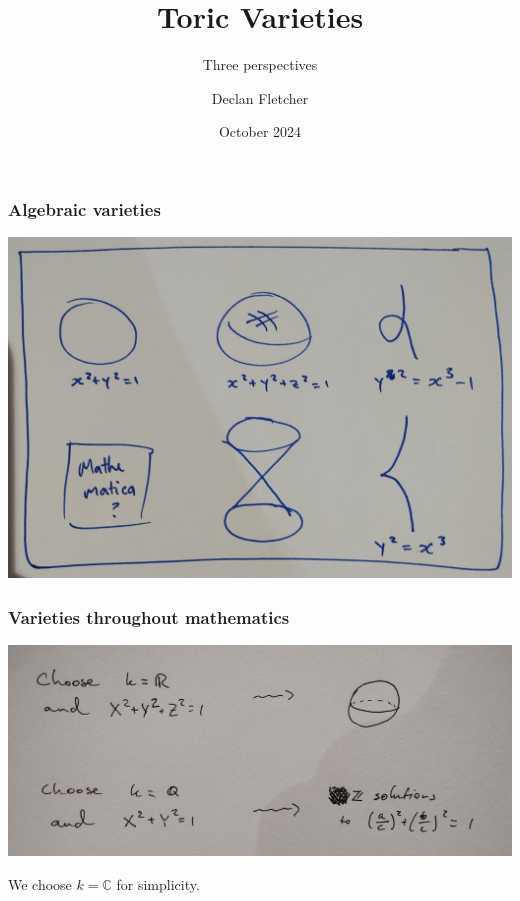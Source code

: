 \documentclass{beamer}
\title{Toric Varieties}
\subtitle{Three perspectives}
\author{Declan Fletcher}
\date{October 2024}
\theoremstyle{definition}
\theoremstyle{definition}
\begin{document}
\begin{frame}
\titlepage
\end{frame}



\begin{frame}
\frametitle{Algebraic varieties}

\includegraphics[width=\textwidth]{varieties}

\end{frame}

\begin{frame}
\frametitle{Varieties throughout mathematics}
\includegraphics[width=\textwidth]{sphere_and_pythag_triples}

We choose $k = \mathbb{C}$ for simplicity.
\end{frame}
\end{document}
